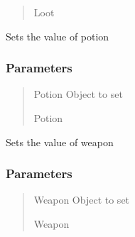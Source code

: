 \documentclass[letterpaper,10pt,english]{sphinxmanual}
\begin{document}
\begin{fulllineitems}
\begin{fulllineitems}
\begin{quote}
\begin{description}
\sphinxAtStartPar
Loot

\end{description}\end{quote}

\end{fulllineitems}


\begin{fulllineitems}
\label{\detokenize{api_reference/dungeon_gui/Room:Room.Room.set_potion}}
\pysigstartsignatures
{}
\pysigstopsignatures
\sphinxAtStartPar
Sets the value of potion


\subsubsection{Parameters}
\label{\detokenize{api_reference/dungeon_gui/Room:id4}}\begin{quote}\begin{description}
\sphinxAtStartPar
Potion Object to set

\sphinxAtStartPar
Potion

\end{description}\end{quote}

\end{fulllineitems}


\begin{fulllineitems}
\label{\detokenize{api_reference/dungeon_gui/Room:Room.Room.set_weapon}}
\pysigstartsignatures
{}
\pysigstopsignatures
\sphinxAtStartPar
Sets the value of weapon


\subsubsection{Parameters}
\label{\detokenize{api_reference/dungeon_gui/Room:id5}}\begin{quote}\begin{description}
\sphinxAtStartPar
Weapon Object to set

\sphinxAtStartPar
Weapon

\end{description}\end{quote}

\end{fulllineitems}


\end{fulllineitems}
\end{document}
